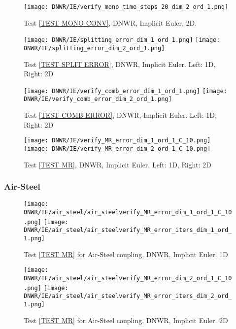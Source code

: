 \documentclass[a4paper,10pt]{article}
\begin{document}
\begin{figure}[!ht]
\texttt{[image: DNWR/IE/verify\_mono\_time\_steps\_20\_dim\_2\_ord\_1.png]}
\caption{Test \ref{TEST MONO CONV}, DNWR, Implicit Euler, 2D.}
\label{FIG DNWR IE 2D MONO CONV}
\end{figure}

\begin{figure}[!ht]
\texttt{[image: DNWR/IE/splitting\_error\_dim\_1\_ord\_1.png]}
\texttt{[image: DNWR/IE/splitting\_error\_dim\_2\_ord\_1.png]}
\caption{Test \ref{TEST SPLIT ERROR}, DNWR, Implicit Euler. Left: 1D, Right: 2D}
\label{FIG DNWR IE SPLIT ERROR}
\end{figure}

\begin{figure}[!ht]
\texttt{[image: DNWR/IE/verify\_comb\_error\_dim\_1\_ord\_1.png]}
\texttt{[image: DNWR/IE/verify\_comb\_error\_dim\_2\_ord\_1.png]}
\caption{Test \ref{TEST COMB ERROR}, DNWR, Implicit Euler. Left: 1D, Right: 2D}
\label{FIG DNWR IE COMB ERROR}
\end{figure}

\begin{figure}[!ht]
\texttt{[image: DNWR/IE/verify\_MR\_error\_dim\_1\_ord\_1\_C\_10.png]}
\texttt{[image: DNWR/IE/verify\_MR\_error\_dim\_2\_ord\_1\_C\_10.png]}
\caption{Test \ref{TEST MR}, DNWR, Implicit Euler. Left: 1D, Right: 2D}
\label{FIG DNWR IE MR ERROR}
\end{figure}
% 
\FloatBarrier
\subsubsection{Air-Steel}\label{SEC DNWR IE AIR STEEL}
%

\begin{figure}[!ht]
\texttt{[image: DNWR/IE/air\_steel/air\_steelverify\_MR\_error\_dim\_1\_ord\_1\_C\_10.png]}
\texttt{[image: DNWR/IE/air\_steel/air\_steelverify\_MR\_error\_iters\_dim\_1\_ord\_1.png]}
\caption{Test \ref{TEST MR} for Air-Steel coupling, DNWR, Implicit Euler. 1D}
\label{FIG DNWR IE AIR STEEL 1D}
\end{figure}

\begin{figure}[!ht]
\texttt{[image: DNWR/IE/air\_steel/air\_steelverify\_MR\_error\_dim\_2\_ord\_1\_C\_10.png]}
\texttt{[image: DNWR/IE/air\_steel/air\_steelverify\_MR\_error\_iters\_dim\_2\_ord\_1.png]}
\caption{Test \ref{TEST MR} for Air-Steel coupling, DNWR, Implicit Euler. 2D}
\label{FIG DNWR IE AIR STEEL 2D}
\end{figure}
\end{document}
